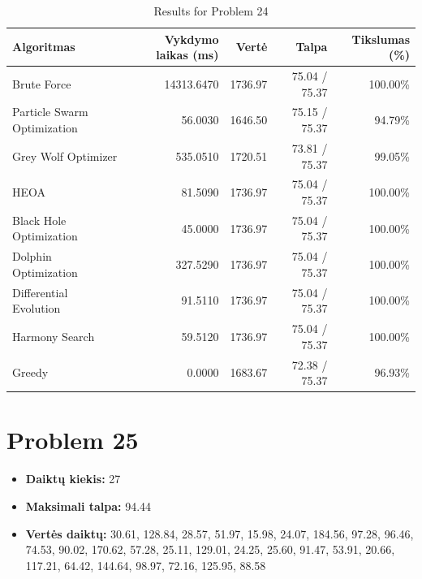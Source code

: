 \documentclass[a4paper,11pt]{article}
\begin{document}
\begin{table}[h!]
\centering
\begin{tabular}{lrrrr}
\toprule
\textbf{Algoritmas} & \textbf{Vykdymo laikas (ms)} & \textbf{Vertė} & \textbf{Talpa} & \textbf{Tikslumas (\%)} \\
\midrule
Brute Force & 14313.6470 & 1736.97 & 75.04 / 75.37 & 100.00\% \\
Particle Swarm Optimization & 56.0030 & 1646.50 & 75.15 / 75.37 & 94.79\% \\
Grey Wolf Optimizer & 535.0510 & 1720.51 & 73.81 / 75.37 & 99.05\% \\
HEOA & 81.5090 & 1736.97 & 75.04 / 75.37 & 100.00\% \\
Black Hole Optimization & 45.0000 & 1736.97 & 75.04 / 75.37 & 100.00\% \\
Dolphin Optimization & 327.5290 & 1736.97 & 75.04 / 75.37 & 100.00\% \\
Differential Evolution & 91.5110 & 1736.97 & 75.04 / 75.37 & 100.00\% \\
Harmony Search & 59.5120 & 1736.97 & 75.04 / 75.37 & 100.00\% \\
Greedy & 0.0000 & 1683.67 & 72.38 / 75.37 & 96.93\% \\
\bottomrule
\end{tabular}
\caption{Results for Problem 24}
\end{table}
\clearpage

\section*{Problem 25}
\begin{itemize}
    \item \textbf{Daiktų kiekis:} 27
    \item \textbf{Maksimali talpa:} 94.44
    \item \textbf{Vertės daiktų:} 30.61, 128.84, 28.57, 51.97, 15.98, 24.07, 184.56, 97.28, 96.46, 74.53, 90.02, 170.62, 57.28, 25.11, 129.01, 24.25, 25.60, 91.47, 53.91, 20.66, 117.21, 64.42, 144.64, 98.97, 72.16, 125.95, 88.58
\end{itemize}
\end{document}
